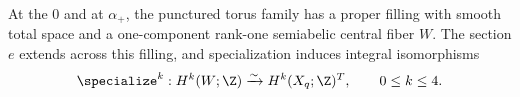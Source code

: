 \begin{proposition}
\label{fill:rankone}
At the $0$ and at $\alpha_+$, the punctured torus family has
a proper filling with smooth total space and a one-component
rank-one semiabelic central fiber $W$. The section $e$
extends across this filling, and specialization induces integral isomorphisms
\[
 \specialize^k:H^k(W;\Z)\xrightarrow{\sim}H^k(X_q;\Z)^T,
 \qquad 0\leq k\leq4.
\]
\end{proposition}
